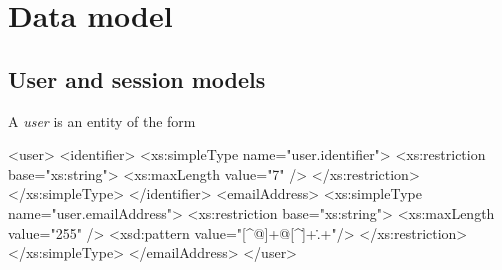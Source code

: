 \chapter{Data model}

\section{User and session models}

\begin{definition}[User]\label{user}
A \emph{user} is an entity of the form
\begin{code}
<user>
  <identifier>
    <xs:simpleType name="user.identifier">
      <xs:restriction base="xs:string">
        <xs:maxLength value="7" />
      </xs:restriction>
    </xs:simpleType>
  </identifier>
  <emailAddress>
    <xs:simpleType name="user.emailAddress">
      <xs:restriction base="xs:string">
        <xs:maxLength value="255" />
        <xsd:pattern value="[^@]+@[^\.]+\..+"/>
      </xs:restriction>
    </xs:simpleType>
  </emailAddress>
</user>
\end{code}
\end{definition}
